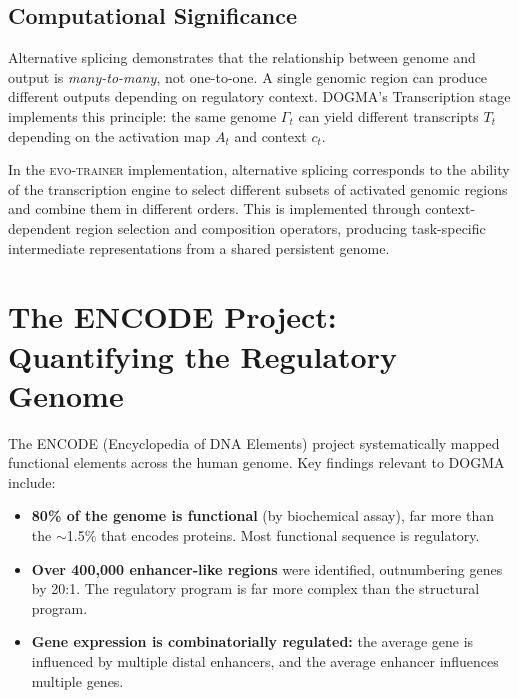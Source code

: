 \subsection{Computational Significance}

Alternative splicing demonstrates that the relationship between genome and output is \emph{many-to-many}, not one-to-one. A single genomic region can produce different outputs depending on regulatory context. DOGMA's Transcription stage implements this principle: the same genome $\Gamma_t$ can yield different transcripts $T_t$ depending on the activation map $A_t$ and context $c_t$.

\begin{implnote}
In the \textsc{evo-trainer} implementation, alternative splicing corresponds to the ability of the transcription engine to select different subsets of activated genomic regions and combine them in different orders. This is implemented through context-dependent region selection and composition operators, producing task-specific intermediate representations from a shared persistent genome.
\end{implnote}

\section{The ENCODE Project: Quantifying the Regulatory Genome}
\label{sec:encode}

The ENCODE (Encyclopedia of DNA Elements) project \citep{encode2012} systematically mapped functional elements across the human genome. Key findings relevant to DOGMA include:

\begin{itemize}[leftmargin=1.8em]
  \item \textbf{80\% of the genome is functional} (by biochemical assay), far more than the $\sim$1.5\% that encodes proteins. Most functional sequence is regulatory.

  \item \textbf{Over 400,000 enhancer-like regions} were identified, outnumbering genes by 20:1. The regulatory program is far more complex than the structural program.

  \item \textbf{Gene expression is combinatorially regulated:} the average gene is influenced by multiple distal enhancers, and the average enhancer influences multiple genes.
\end{itemize}

